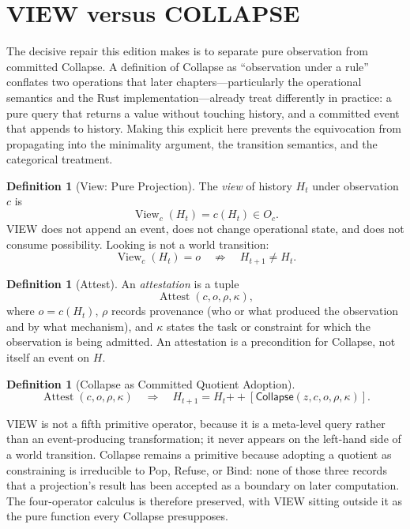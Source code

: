 \documentclass[12pt, a4paper, openany]{book}
\theoremstyle{plain}
\theoremstyle{definition}
\newtheorem{definition}[theorem]{Definition}
\theoremstyle{remark}
\newcommand{\Collapse}{\mathsf{Collapse}}
\begin{document}
\section{VIEW versus COLLAPSE}
\label{sec:view-vs-collapse}

The decisive repair this edition makes is to separate pure observation from
committed Collapse. A definition of Collapse as ``observation under a rule''
conflates two operations that later chapters---particularly the operational
semantics and the Rust implementation---already treat differently in practice:
a pure query that returns a value without touching history, and a committed
event that appends to history. Making this explicit here prevents the
equivocation from propagating into the minimality argument, the transition
semantics, and the categorical treatment.

\begin{definition}[View: Pure Projection]
The \emph{view} of history $H_t$ under observation $c$ is
\[
\operatorname{View}_c(H_t) = c(H_t) \in O_c.
\]
VIEW does not append an event, does not change operational state, and does not
consume possibility. Looking is not a world transition:
\[
\operatorname{View}_c(H_t) = o \quad \not\Rightarrow \quad H_{t+1} \neq H_t.
\]
\end{definition}

\begin{definition}[Attest]
An \emph{attestation} is a tuple
\[
\operatorname{Attest}(c, o, \rho, \kappa),
\]
where $o = c(H_t)$, $\rho$ records provenance (who or what produced the
observation and by what mechanism), and $\kappa$ states the task or constraint
for which the observation is being admitted. An attestation is a precondition
for Collapse, not itself an event on $H$.
\end{definition}

\begin{definition}[Collapse as Committed Quotient Adoption]
\[
\operatorname{Attest}(c, o, \rho, \kappa)
\quad\Rightarrow\quad
H_{t+1} = H_t \mathbin{++} [\Collapse(z, c, o, \rho, \kappa)].
\]
\end{definition}

VIEW is not a fifth primitive operator, because it is a meta-level query rather
than an event-producing transformation; it never appears on the left-hand side
of a world transition. Collapse remains a primitive because adopting a quotient
as constraining is irreducible to Pop, Refuse, or Bind: none of those three
records that a projection's result has been accepted as a boundary on later
computation. The four-operator calculus is therefore preserved, with VIEW
sitting outside it as the pure function every Collapse presupposes.
\end{document}
